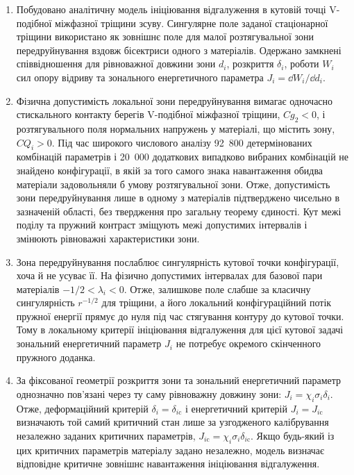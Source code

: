\begin{enumerate}
\item Побудовано аналітичну модель ініціювання відгалуження в кутовій точці V-подібної міжфазної тріщини зсуву. Сингулярне поле заданої стаціонарної тріщини використано як зовнішнє поле для малої розтягувальної зони передруйнування вздовж бісектриси одного з матеріалів. Одержано замкнені співвідношення для рівноважної довжини зони $d_i$, розкриття $\delta_i$, роботи $W_i$ сил опору відриву та зонального енергетичного параметра $J_i=\dd W_i/\dd d_i$.

\item Фізична допустимість локальної зони передруйнування вимагає одночасно стискального контакту берегів V-подібної міжфазної тріщини, $Cg_2<0$, і розтягувального поля нормальних напружень у матеріалі, що містить зону, $CQ_i>0$. Під час широкого числового аналізу 92~800 детермінованих комбінацій параметрів і 20~000 додаткових випадково вибраних комбінацій не знайдено конфігурації, в якій за того самого знака навантаження обидва матеріали задовольняли б умову розтягувальної зони. Отже, допустимість зони передруйнування лише в одному з матеріалів підтверджено чисельно в зазначеній області, без твердження про загальну теорему єдиності. Кут межі поділу та пружний контраст зміщують межі допустимих інтервалів і змінюють рівноважні характеристики зони.

\item Зона передруйнування послаблює сингулярність кутової точки конфігурації, хоча й не усуває її. На фізично допустимих інтервалах для базової пари матеріалів $-1/2<\lambda_i<0$. Отже, залишкове поле слабше за класичну сингулярність $r^{-1/2}$ для тріщини, а його локальний конфігураційний потік пружної енергії прямує до нуля під час стягування контуру до кутової точки. Тому в локальному критерії ініціювання відгалуження для цієї кутової задачі зональний енергетичний параметр $J_i$ не потребує окремого скінченного пружного доданка.

\item За фіксованої геометрії розкриття зони та зональний енергетичний параметр однозначно пов’язані через ту саму рівноважну довжину зони: $J_i=\chi_i\sigma_i\delta_i$. Отже, деформаційний критерій $\delta_i=\delta_{i\mathrm{c}}$ і енергетичний критерій $J_i=J_{i\mathrm{c}}$ визначають той самий критичний стан лише за узгодженого калібрування незалежно заданих критичних параметрів, $J_{i\mathrm{c}}=\chi_i\sigma_i\delta_{i\mathrm{c}}$. Якщо будь-який із цих критичних параметрів матеріалу задано незалежно, модель визначає відповідне критичне зовнішнє навантаження ініціювання відгалуження.


\end{enumerate}
